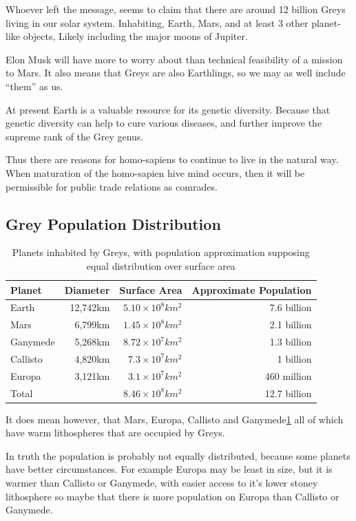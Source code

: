 \documentclass{report}
\begin{document}
Whoever left the message, seems to claim that there are around 12 billion
Greys living in our solar system. Inhabiting, Earth, Mars, and at least 3 other
planet-like objects, Likely including the major moons of Jupiter. 

Elon Musk will have more to worry about than technical feasibility of a mission
to Mars. It also means that Greys are also Earthlings, so we may as well include
``them'' as us. 

At present Earth is a valuable resource for its genetic diversity. Because that
genetic diversity can help to cure various diseases, and further improve the
supreme rank of the Grey genus. 

Thus there are reasons for homo-sapiens to continue to live in the natural way.
When maturation of the homo-sapien hive mind occurs, then it will be
permissible for public trade relations as comrades.

\subsection{Grey Population Distribution}
\label{popdist}
\begin{table}
\begin{tabular}{lrrr}
  Planet & Diameter & Surface Area & Approximate Population\\
\midrule
  Earth & 12,742km & $5.10\times10^8km^2$& 7.6 billion\\
  Mars & 6,799km & $1.45\times10^8km^2$& 2.1 billion \\
  Ganymede & 5,268km & $8.72\times10^7km^2$ & 1.3 billion \\
  Callisto & 4,820km & $7.3\times10^7km^2$ & 1 billion\\
  Europa & 3,121km & $3.1\times10^7km^2$& 460 million\\
\midrule
  Total &   & $8.46\times10^8km^2$ & 12.7 billion\\
\end{tabular}
\caption{Planets inhabited by Greys, with population approximation supposing
equal distribution over surface area}
\label{table:planets}
\end{table}

It does mean however, that Mars, Europa, Callisto and 
Ganymede\ref{table:planets} all of which
have warm lithospheres that are occupied by Greys. 

In truth the population is probably not equally distributed, because some
planets have better circumstances. For example Europa may be least in size, but
it is warmer than Callisto or Ganymede, with easier access to it's lower stoney
lithosphere so maybe that there is more population on Europa than Callisto or
Ganymede. 
\end{document}
